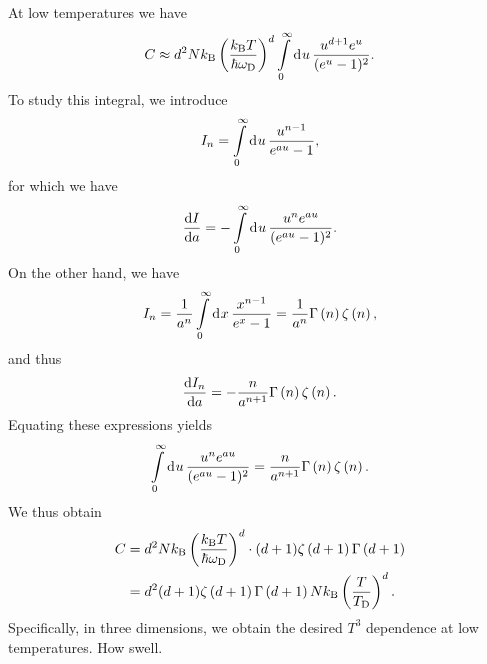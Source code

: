 At low temperatures we have
\begin{align*}
	C \approx d^{2}Nk_{\text{B}}\left(\frac{k_{\text{B}} T}{\hbar\omega_{\text{D}}}\right)^{d}\int\limits_{0}^{\infty}\dd[]{u}\frac{u^{d + 1} e^{u}}{(e^{u} - 1)^{2}}.
\end{align*}
To study this integral, we introduce
\begin{align*}
	I_{n} = \int\limits_{0}^{\infty}\dd[]{u}\frac{u^{n - 1}}{e^{au} - 1},
\end{align*}
for which we have
\begin{align*}
	\dv{I}{a} = -\int\limits_{0}^{\infty}\dd[]{u}\frac{u^{n}e^{au}}{(e^{au} - 1)^{2}}.
\end{align*}
On the other hand, we have
\begin{align*}
	I_{n} = \frac{1}{a^{n}}\int\limits_{0}^{\infty}\dd[]{x}\frac{x^{n - 1}}{e^{x} - 1} = \frac{1}{a^{n}}\Gamma\left(n\right)\zeta\left(n\right),
\end{align*}
and thus
\begin{align*}
	\dv{I_{n}}{a} = -\frac{n}{a^{n + 1}}\Gamma\left(n\right)\zeta\left(n\right).
\end{align*}
Equating these expressions yields
\begin{align*}
	\int\limits_{0}^{\infty}\dd[]{u}\frac{u^{n}e^{au}}{(e^{au} - 1)^{2}} = \frac{n}{a^{n + 1}}\Gamma\left(n\right)\zeta\left(n\right).
\end{align*}
We thus obtain
\begin{align*}
	C &= d^{2}Nk_{\text{B}}\left(\frac{k_{\text{B}} T}{\hbar\omega_{\text{D}}}\right)^{d}\cdot (d + 1)\zeta\left(d + 1\right)\Gamma\left(d + 1\right) \\
	  &= d^{2}(d + 1)\zeta\left(d + 1\right)\Gamma\left(d + 1\right)Nk_{\text{B}}\left(\frac{T}{T_{\text{D}}}\right)^{d}.
\end{align*}
Specifically, in three dimensions, we obtain the desired $T^{3}$ dependence at low temperatures. How swell.